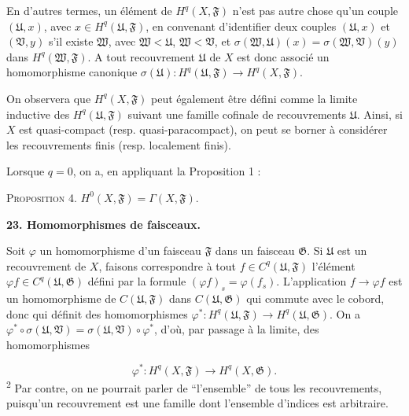 En d'autres termes, un élément de $H^q(X, \mathfrak{F})$ n'est pas autre chose qu'un couple $(\mathfrak{U}, x)$, avec $x \in H^q(\mathfrak{U}, \mathfrak{F})$, en convenant d'identifier deux couples $(\mathfrak{U}, x)$ et $(\mathfrak{V}, y)$ s'il existe $\mathfrak{W}$, avec $\mathfrak{W} < \mathfrak{U}$, $\mathfrak{W} < \mathfrak{V}$, et $\sigma(\mathfrak{W}, \mathfrak{U})(x) = \sigma(\mathfrak{W}, \mathfrak{V})(y)$ dans $H^q(\mathfrak{W}, \mathfrak{F})$. A tout recouvrement $\mathfrak{U}$ de $X$ est donc associé un homomorphisme canonique $\sigma(\mathfrak{U}) : H^q(\mathfrak{U}, \mathfrak{F}) \to H^q(X, \mathfrak{F})$.

On observera que $H^q(X, \mathfrak{F})$ peut également être défini comme la limite inductive des $H^q(\mathfrak{U}, \mathfrak{F})$ suivant une famille cofinale de recouvrements $\mathfrak{U}$. Ainsi, si $X$ est quasi-compact (resp. quasi-paracompact), on peut se borner à considérer les recouvrements finis (resp. localement finis).

Lorsque $q = 0$, on a, en appliquant la Proposition 1 :

\textsc{Proposition} 4. $H^0(X, \mathfrak{F}) = \Gamma(X, \mathfrak{F})$.


\textbf{23. Homomorphismes de faisceaux.}

Soit $\varphi$ un homomorphisme d'un faisceau $\mathfrak{F}$ dans un faisceau $\mathfrak{G}$. Si $\mathfrak{U}$ est un recouvrement de $X$, faisons correspondre à tout $f \in C^q(\mathfrak{U}, \mathfrak{F})$ l'élément $\varphi f \in C^q(\mathfrak{U}, \mathfrak{G})$ défini par la formule $(\varphi f)_s = \varphi(f_s)$. L'application $f \to \varphi f$ est un homomorphisme de $C(\mathfrak{U}, \mathfrak{F})$ dans $C(\mathfrak{U}, \mathfrak{G})$ qui commute avec le cobord, donc qui définit des homomorphismes $\varphi^* : H^q(\mathfrak{U}, \mathfrak{F}) \to H^q(\mathfrak{U}, \mathfrak{G})$. On a $\varphi^* \circ \sigma(\mathfrak{U}, \mathfrak{V}) = \sigma(\mathfrak{U}, \mathfrak{V}) \circ \varphi^*$, d'où, par passage à la limite, des homomorphismes

\begin{equation*}
\varphi^* : H^q(X, \mathfrak{F}) \to H^q(X, \mathfrak{G}).
\end{equation*}
\textsuperscript{2} Par contre, on ne pourrait parler de ``l'ensemble'' de tous les recouvrements, puisqu'un recouvrement est une famille dont l'ensemble d'indices est arbitraire.



